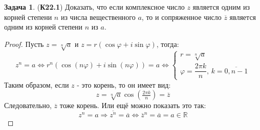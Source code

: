 \documentclass[12pt]{article}
\newcommand{\MR}{\mathbb{R}}
\theoremstyle{definition}
\newtheorem{problem}{Задача}
\newcommand{\ovl}[1]{\overline{#1}}
\begin{document}
\begin{problem}(\textbf{К22.1})
	Доказать, что если комплексное число $z$ является одним из корней степени $n$ из числа вещественного $a$, то и сопряженное число $\ovl{z}$ является одним из корней степени $n$ из $a$.
\end{problem}
\begin{proof}
	Пусть $z = \sqrt[n]{a}$ и $z = r(\cos\varphi + i\sin\varphi)$, тогда:
	$$
		z^n = a \Leftrightarrow r^n(\cos(n\varphi) + i\sin(n\varphi)) = a \Leftrightarrow 
		\begin{cases}
			r = \sqrt[n]{a}\\
			\varphi = \dfrac{2\pi k}{n}, \, k = \ovl{0,n-1} 
		\end{cases}
	$$
	Таким образом, если $z$ - это корень, то он имеет вид:
	$$
		z = \sqrt[n]{a}\cos\left(\tfrac{2\pi k}{n}\right) = \ovl{z}
	$$
	Следовательно, $\ovl{z}$ тоже корень. Или ещё можно показать это так:
	$$
		z^n = a \Rightarrow \ovl{z^n} = \ovl{a} \Leftrightarrow \ovl{z}^n = \ovl{a} = a \in \MR 
	$$
\end{proof}
\end{document}
